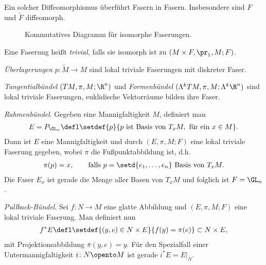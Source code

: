 \documentclass[%
	paper=a5,%
	fleqn,%
	DIV=18,%
	BCOR=0mm,
	fontsize=11pt,
	titlepage=false,%
	bibliography=totoc,
	DIV=18,%
	twoside=true,
	pdftitle=Riemannsche Geometrie,
	pdfauthor=Uwe Semmelmann,
	numbers=noendperiod]%
	{scrbook}
\begin{document}
Ein solcher Diffeomorphismus überführt Fasern in Fasern. Insbesondere sind $F$
und $\tilde{F}$ diffeomorph.

\begin{figure}
\centering
{}
\caption{Kommutatives Diagramm für isomorphe Faserungen.}
\end{figure}


\begin{rem}
Eine Faserung heißt \emph{trivial}, falls sie isomorph ist zu $(M\times
F,\pr_1,M;F)$.
\end{rem}

\begin{ex}
\begin{exenum}
\item \textit{Überlagerungen} $p\colon \tilde{M}\to M$ sind lokal triviale
Faserungen mit diskreter Faser.
\item \textit{Tangentialbündel} $(TM,\pi,M;\R^n)$ und
\textit{Formenbündel} $(\Lambda^k TM,\pi,M;\Lambda^k\R^n)$ sind lokal triviale
Faserungen, euklidische Vektorräume bilden ihre Faser.
\item {}\textit{Rahmenbündel}. Gegeben eine Mannigfaltigkeit
$M$, definiert man
\begin{align*}
E = P_{\GL_n} \defl
\setdef{p}{p\text{ ist Basis von }T_xM,\text{ für ein }x\in M}.
\end{align*}
Dann ist $E$ eine Mannigfaltigkeit und durch $(E,\pi,M;F)$ eine lokal triviale
Faserung gegeben, wobei $\pi$ die Fußpunktabbildung ist, d.h.
\begin{align*}
\pi(p) = x,\qquad \text{falls } p = \setd{e_1,\ldots,e_n} \text{ Basis von
}T_xM.
\end{align*}
Die Faser $E_x$ ist gerade die Menge aller Basen von $T_xM$ und folglich ist $F
= \GL_n$.
\item {}\textit{Pullback-Bündel}. Sei $f\colon N\to M$ eine
glatte Abbildung und $(E,\pi,M;F)$ eine lokal triviale Faserung. Man definiert nun
\begin{align*}
f^*E \defl \setdef{(y,e)\in N\times E}{f(y) = \pi(e)} \subset N\times E, 
\end{align*}
mit Projektionsabbildung $\bar{\pi}(y,e) = y$.
Für den Spezialfall einer Untermannigfaltigkeit $i\colon N\opento M$ ist gerade $i^*E
= E\big|_N$.\boxc
\end{exenum}
\end{ex}
\end{document}
